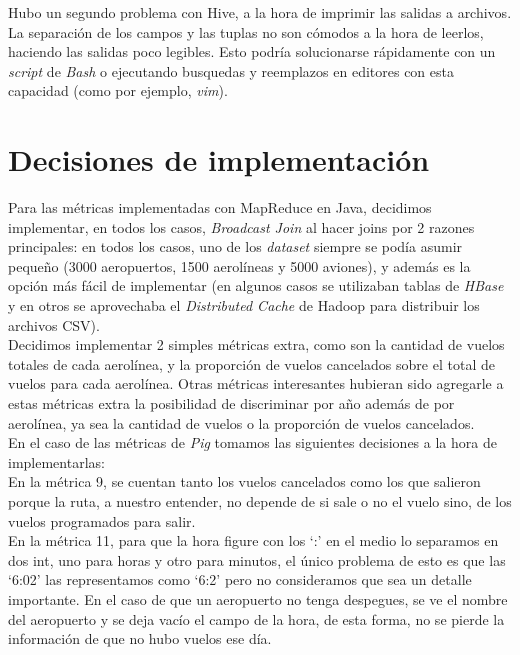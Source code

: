 \documentclass[a4paper,10pt]{article}
\begin{document}
Hubo un segundo problema con Hive, a la hora de imprimir las salidas a archivos. La separación de los campos y las tuplas no son cómodos a la hora de leerlos, haciendo las salidas poco legibles. Esto podría solucionarse rápidamente con un \textit{script} de \textit{Bash} o ejecutando busquedas y reemplazos en editores con esta capacidad (como por ejemplo, \textit{vim}).

\section{Decisiones de implementación}

Para las métricas implementadas con MapReduce en Java, decidimos implementar, en todos los casos, \textit{Broadcast Join} al hacer joins por 2 razones principales: en todos los casos,
uno de los \textit{dataset} siempre se podía asumir pequeño (3000 aeropuertos, 1500 aerolíneas y 5000 aviones), y además es la opción más fácil de implementar (en algunos casos se
utilizaban tablas de \textit{HBase} y en otros se aprovechaba el \textit{Distributed Cache} de Hadoop para distribuir los archivos CSV).\\

Decidimos implementar 2 simples métricas extra, como son la cantidad de vuelos totales de cada aerolínea, y la proporción de vuelos cancelados sobre el total de vuelos para cada
aerolínea. Otras métricas interesantes hubieran sido agregarle a estas métricas extra la posibilidad de discriminar por año además de por aerolínea, ya sea la cantidad de vuelos
o la proporción de vuelos cancelados.\\

En el caso de las métricas de \textit{Pig} tomamos las siguientes decisiones a la hora de implementarlas:\\

En la métrica 9, se cuentan tanto los vuelos cancelados como los que salieron porque la ruta, a nuestro entender, no depende de si sale o no el vuelo sino, de los vuelos programados para salir. \\

En la métrica 11, para que la hora figure con los ‘:’ en el medio lo separamos en dos int, uno para horas y otro para minutos, el único problema de esto es que las ‘6:02’ las representamos como ‘6:2’ pero no consideramos que sea un detalle importante.
En el caso de que un aeropuerto no tenga despegues, se ve el nombre del aeropuerto y se deja vacío el campo de la hora, de esta forma, no se pierde la información de que no hubo vuelos ese día.\\
\end{document}
